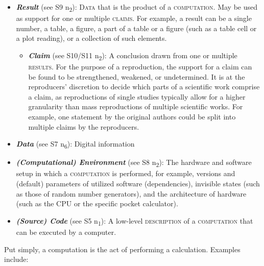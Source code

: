 \documentclass[authordate, meta]{jote-new-article}
\begin{document}
	\begin{itemize}[label=\phantom{\textbullet},topsep=0pt]
		\item \emph{\textbf{Result}} (see S9 \rightarrow{ }n\textsubscript{2}): \textsc{Data} that is the product of a \textsc{computation}. May be used as support for one or multiple \textsc{claims.} For example, a result can be a single number, a table, a figure, a part of a table or a figure (such as a table cell or a plot reading), or a collection of such elements.
		\begin{itemize}[label=\phantom{\textbullet}]
			\item \emph{\textbf{Claim}} (see S10/S11 \rightarrow{ }n\textsubscript{2}): A conclusion drawn from one or multiple \textsc{results}. For the purpose of a reproduction, the support for a claim can be found to be strengthened, weakened, or undetermined. It is at the reproducers' discretion to decide which parts of a scientific work comprise a claim, as reproductions of single studies typically allow for a higher granularity than mass reproductions of multiple scientific works. For example, one statement by the original authors could be split into multiple claims by the reproducers.
		\end{itemize}
		\item \emph{\textbf{Data}} (see S7 \rightarrow{ }n\textsubscript{6}): Digital information
		\item \emph{\textbf{(Computational) Environment}} (see S8 \rightarrow{ }n\textsubscript{2}): The hardware and software setup in which a \textsc{computation} is performed, for example, versions and (default) parameters of utilized software (dependencies), invisible states (such as those of random number generators), and the architecture of hardware (such as the CPU or the specific pocket calculator).
		\item \emph{\textbf{(Source) Code}} (see S5 \rightarrow{ }n\textsubscript{1}): A low-level \textsc{description} of a \textsc{computation} that can be executed by a computer.
	\end{itemize}

	\vspace{\topsep}


	Put simply, a computation is the act of performing a calculation. Examples include:
\end{document}
